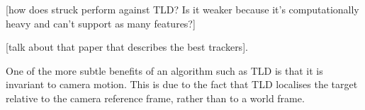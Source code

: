 [how does struck perform against TLD? Is it weaker because it's computationally heavy and can't support as many features?]  

[talk about that paper that describes the best trackers].

One of the more subtle benefits of an algorithm such as TLD is that it is invariant to camera motion. This is due to the fact that TLD localises the target relative to the camera reference frame, rather than to a world frame. 







